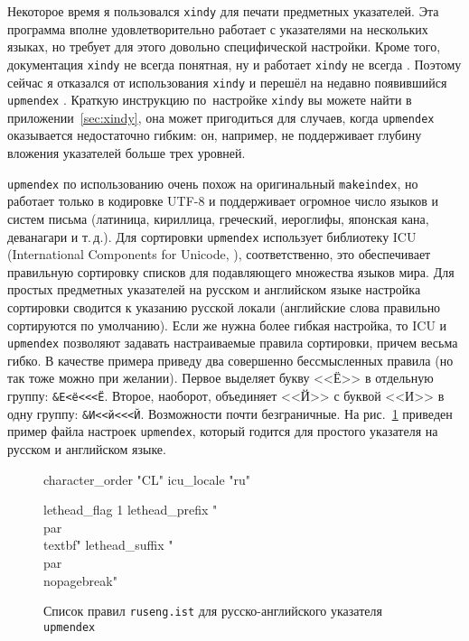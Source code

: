 \documentclass[a4paper,12pt,hyphens]{article}
\newcommand\exe[1]{\texttt{#1}}
\newcommand\file[1]{\texttt{#1}}
\begin{document}
Некоторое время я пользовался \exe{xindy} \parencite{ctan-xindy} для печати предметных указателей. Эта программа
вполне удовлетворительно работает с указателями на нескольких языках, но требует для этого довольно специфической настройки.
Кроме того, документация \exe{xindy} не всегда понятная, ну и работает \exe{xindy} не всегда \parencite{se-xindy}.
Поэтому сейчас я отказался от использования \exe{xindy} и перешёл на недавно появившийся \exe{upmendex} \parencite{ctan-upmendex}. Краткую инструкцию по~настройке \exe{xindy} вы можете найти в приложении~\ref{sec:xindy}, она может пригодиться для случаев, когда \exe{upmendex} оказывается недостаточно гибким: он, например, не поддерживает глубину вложения указателей больше трех уровней.

\exe{upmendex} по использованию очень похож на оригинальный \exe{makeindex}, но работает только в кодировке UTF-8
и поддерживает огромное число языков и систем письма (латиница, кириллица, греческий, иероглифы, японская кана, деванагари и т.\,д.).
Для сортировки \exe{upmendex} использует библиотеку ICU (International Components for Unicode, \parencite{site-icu}),
соответственно, это обеспечивает правильную сортировку списков для подавляющего множества языков мира. Для простых
предметных указателей на русском и английском языке настройка сортировки сводится к указанию русской локали (английские
слова правильно сортируются по умолчанию). Если же нужна более гибкая настройка, то ICU и \exe{upmendex} позволяют
задавать настраиваемые правила сортировки, причем весьма гибко. В качестве примера приведу два совершенно бессмысленных
правила (но так тоже можно при желании). Первое выделяет букву <<Ё>> в отдельную группу: \texttt{\&Е<ё<<<Ё}. Второе, наоборот,
объединяет <<Й>> с буквой <<И>> в одну группу: \texttt{\&И<<й<<<Й}. Возможности почти безграничные.
На рис.~\ref{upmendex1} приведен пример файла настроек \exe{upmendex}, который годится для простого указателя на русском и английском языке.
\begin{figure}[tp]
\begin{istcode}
character_order "CL"
icu_locale "ru"

lethead_flag 1
lethead_prefix "\n  \\par\\textbf{"
lethead_suffix  "}\\par\\nopagebreak"
\end{istcode}
\caption{Список правил \file{ruseng.ist} для русско-английского указателя
\exe{upmendex}}\label{upmendex1}
\end{figure}
\end{document}
